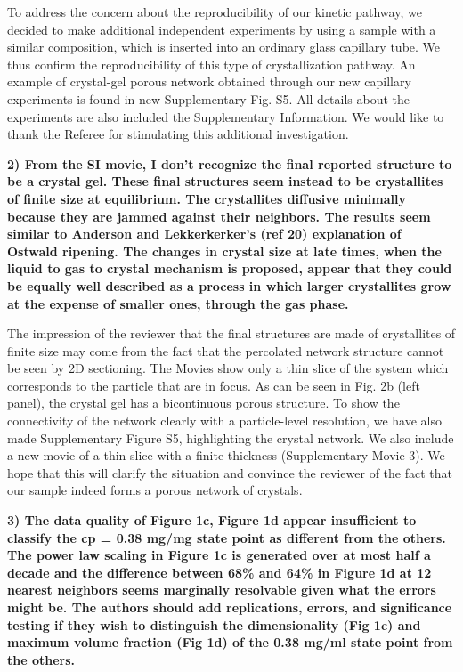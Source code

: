 \documentclass[11pt,a4paper]{article}
\newenvironment{referee}%
{\bigskip\singlespacing\bf}%
{\par\bigskip}
\begin{document}
To address the concern about the reproducibility of our kinetic pathway, we decided to make additional independent experiments
by using a sample with a similar composition, which is inserted into an ordinary glass capillary tube. We thus confirm the reproducibility of this type of crystallization pathway. An example of crystal-gel porous  network obtained through our new capillary experiments is found in new Supplementary Fig. S5. All details about the experiments are also included the Supplementary Information. We would like to thank the Referee for stimulating this additional investigation.


\begin{referee}
2) From the SI movie, I don't recognize the final reported structure to be a crystal gel. These final structures seem instead to be crystallites of finite size at equilibrium. The crystallites diffusive minimally because they are jammed against their neighbors. The results seem similar to Anderson and Lekkerkerker's (ref 20) explanation of Ostwald ripening. The changes in crystal size at late times, when the liquid to gas to crystal mechanism is proposed, appear that they could be equally well described as a process in which larger crystallites grow at the expense of smaller ones, through the gas phase.
\end{referee}

The impression of the reviewer that the final structures are made of crystallites of finite size may come from the fact that the percolated network structure cannot be seen by 2D sectioning. The Movies show only a thin slice of the system which corresponds to the particle that are in focus. 
As can be seen in Fig. 2b (left panel), the crystal gel has a bicontinuous porous structure. 
To show the connectivity of the network clearly with a particle-level resolution, we have also made Supplementary Figure S5, highlighting the crystal network. 
We also include a new movie of a thin slice with a finite thickness (Supplementary Movie 3).
We hope that this will clarify the situation and convince the reviewer of the fact that our sample indeed forms a porous network of crystals. 


\begin{referee}
3) The data quality of Figure 1c, Figure 1d appear insufficient to classify the cp = 0.38 mg/mg state point as different from the others. The power law scaling in Figure 1c is generated over at most half a decade and the difference between 68\% and 64\% in Figure 1d at 12 nearest neighbors seems marginally resolvable given what the errors might be. The authors should add replications, errors, and significance testing if they wish to distinguish the dimensionality (Fig 1c) and maximum volume fraction (Fig 1d) of the 0.38 mg/ml state point from the others.
\end{referee}
\end{document}
